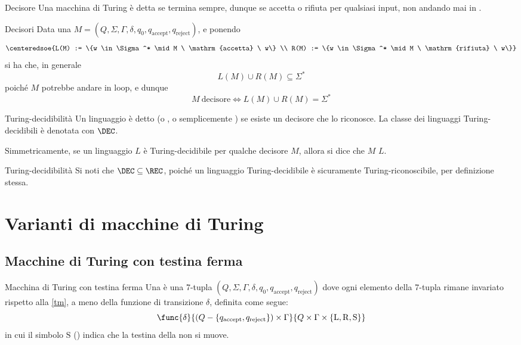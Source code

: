 \documentclass[a4paper, 12pt]{report}
\begin{document}
    \begin{frameddefn}{Decisore}
        Una macchina di Turing è detta  se termina sempre, dunque se accetta o rifiuta per qualsiasi input, non andando mai in .
    \end{frameddefn}

    \begin{framedobs}{Decisori}
        Data una \TM $M = (Q, \Sigma, \Gamma, \delta, q_0, q_\mathrm{accept}, q_\mathrm{reject})$, e ponendo $$\centeredsoe{L(M) := \{w \in \Sigma^* \mid M \ \mathrm{accetta} \ w\} \\ R(M) := \{w \in \Sigma^* \mid M \ \mathrm{rifiuta} \ w\}}$$ si ha che, in generale $$L(M) \cup R(M) \subseteq \Sigma^*$$ poiché $M$ potrebbe andare in loop, e dunque $$M \ \mathrm{decisore} \iff L(M) \cup R(M) = \Sigma^*$$
    \end{framedobs}

    \begin{frameddefn}{Turing-decidibilità}
        Un linguaggio è detto  (o , o semplicemente ) se esiste un decisore che lo riconosce. La classe dei linguaggi Turing-decidibili è denotata con $\mathrm{\DEC}$.

        Simmetricamente, se un linguaggio $L$ è Turing-decidibile per qualche decisore $M$, allora si dice che $M$  $L$.
    \end{frameddefn}

    \begin{framedobs}[label={dec in rec}]{Turing-decidibilità}
        Si noti che $\mathrm{\DEC} \subseteq \REC$, poiché un linguaggio Turing-decidibile è sicuramente Turing-riconoscibile, per definizione stessa.
    \end{framedobs}

    \section{Varianti di macchine di Turing}

    \subsection{Macchine di Turing con testina ferma}

    \begin{frameddefn}[label={stay tm}]{Macchina di Turing con testina ferma}
        Una  è una 7-tupla $(Q, \Sigma, \Gamma, \delta, q_0, q_\mathrm{accept}, q_\mathrm{reject})$ dove ogni elemento della 7-tupla rimane invariato rispetto alla \cref{tm}, a meno della funzione di transizione $\delta$, definita come segue: $$\func{\delta}{(Q - \{q_\mathrm{accept}, q_\mathrm{reject}\}) \times \Gamma}{Q \times \Gamma \times \{\mathrm L, \mathrm R, \mathrm S\}}$$ in cui il simbolo $\mathrm S$ () indica che la testina della \TM non si muove.
    \end{frameddefn}
\end{document}
